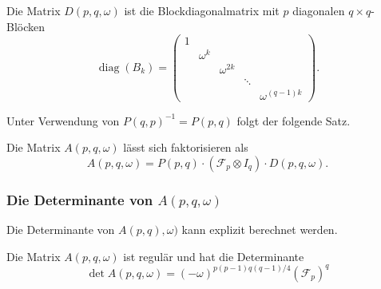 \begin{definition}
Die Matrix $D(p,q,\omega)$ ist die Blockdiagonalmatrix mit $p$ diagonalen
$q\times q$-Blöcken
\[
\operatorname{diag}(
B_k
)
=
\begin{pmatrix}
1&        &           &      &               \\
 &\omega^k&           &      &               \\
 &        &\omega^{2k}&      &               \\
 &        &           &\ddots&               \\
 &        &           &      &\omega^{(q-1)k}
\end{pmatrix}.
\]
\end{definition}

Unter Verwendung von $P(q,p)^{-1}=P(p,q)$ folgt der folgende Satz.

\begin{satz}
Die Matrix $A(p,q,\omega)$ lässt sich faktorisieren als
\begin{equation}
A(p,q,\omega)
=
P(p,q)
\cdot
(\mathscr{F}_p\otimes I_q)
\cdot
D(p,q,\omega).
\label{buch:diskret:faktorisierung:eqn:Afaktorisierung}
\end{equation}
\end{satz}

%
%
\subsubsection{Die Determinante von $A(p,q,\omega)$}
Die Determinante von $A(p,q),\omega)$ kann explizit berechnet werden.

%
%
\begin{satz}
\label{buch:diskret:vandermonde:hauptsatz}
Die Matrix $A(p,q,\omega)$ ist regulär und hat die Determinante
\begin{equation}
\det A(p,q,\omega)
=
(-\omega)^{p(p-1)q(q-1)/4}
(\mathscr{F}_p)^q
\label{buch:diskret:vandermonde:eqn:detA}
\end{equation}
\end{satz}

